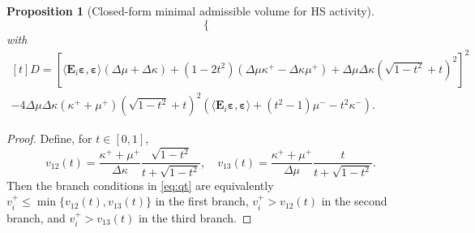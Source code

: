 \documentclass[preprint,3p]{elsarticle}
\newcommand{\tenss}[1]{\bm{\mathbf{#1}}}            %
\newcommand{\tensf}[1]{\bm{\mathbf{#1}}}            %
\newcommand{\strain}{\tenss{\varepsilon}}           %
\newcommand{\Ei}{\tensf{E}_i}                       %
\newtheorem{proposition}{Proposition}[section]
\begin{document}
\begin{proposition}[Closed-form minimal admissible volume for HS activity]
\begin{equation}
\begin{cases}
    \end{cases}
    \end{equation}
    with
    \begin{equation}\label{eq:det}
        \begin{multlined}[t]
        D = \left[\langle\Ei\strain, \strain\rangle (\Delta\mu + \Delta\kappa) + (1 - 2t^2) (\Delta\mu \kappa^+ - \Delta\kappa\mu^+) + \Delta\mu \Delta\kappa (\sqrt{1-t^2} + t)^2\right]^2\\
         - 4 \Delta\mu \Delta\kappa (\kappa^+ + \mu^+) (\sqrt{1-t^2} + t)^2 (\langle\Ei\strain, \strain\rangle + (t^2-1)\mu^- - t^2\kappa^-).
        \end{multlined}
    \end{equation}
\end{proposition}
\begin{proof}
Define, for $t \in [0,1]$,
%
\begin{equation}
    v_{12} (t) = \frac{\kappa^+ + \mu^+}{\Delta\kappa} \frac{\sqrt{1-t^2}}{t + \sqrt{1-t^2}}, \quad v_{13} (t) = \frac{\kappa^+ + \mu^+}{\Delta\mu} \frac{t}{t + \sqrt{1-t^2}}.
\end{equation}
%
Then the branch conditions in \eqref{eq:qt} are equivalently $v_i^+ \le \min\{v_{12}(t), v_{13}(t)\}$ in the first branch, $v_i^+ > v_{12}(t)$ in the second branch, and $v_i^+ > v_{13}(t)$ in the third branch.


\end{proof}
\end{document}
